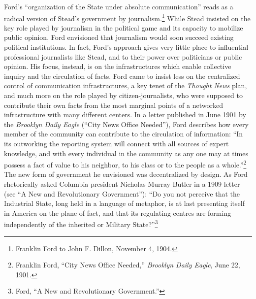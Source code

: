 \documentclass[twoside,symmetric,nobib,justified]{tufte-book}
\begin{document}
Ford's ``organization of the State under absolute communication'' reads
as a radical version of Stead's government by journalism.\footnote{Franklin
  Ford to John F. Dillon, November 4, 1904.} While Stead insisted on the
key role played by journalism in the political game and its capacity to
mobilize public opinion, Ford envisioned that journalism would soon
succeed existing political institutions. In fact, Ford's approach gives
very little place to influential professional journalists like Stead,
and to their power over politicians or public opinion. His focus,
instead, is on the infrastructures which enable collective inquiry and
the circulation of facts. Ford came to insist less on the centralized
control of communication infrastructures, a key tenet of the
\emph{Thought News} plan, and much more on the role played by
citizen-journalists, who were supposed to contribute their own facts
from the most marginal points of a networked infrastructure with many
different centers. In a letter published in June 1901 by the
\emph{Brooklyn Daily Eagle} (``City News Office Needed''), Ford
describes how every member of the community can contribute to the
circulation of information: ``In its outworking the reporting system
will connect with all sources of expert knowledge, and with every
individual in the community as any one may at times possess a fact of
value to his neighbor, to his class or to the people as a
whole.''\footnote{Franklin Ford, ``City News Office Needed,''
  \emph{Brooklyn Daily Eagle}, June 22, 1901.} The new form of
government he envisioned was decentralized by design. As Ford
rhetorically asked Columbia president Nicholas Murray Butler in a 1909
letter (see ``A New and Revolutionary Government''): ``Do you not
perceive that the Industrial State, long held in a language of metaphor,
is at last presenting itself in America on the plane of fact, and that
its regulating centres are forming independently of the inherited or
Military State?''\footnote{Ford, ``A New and Revolutionary Government.''}
\end{document}
